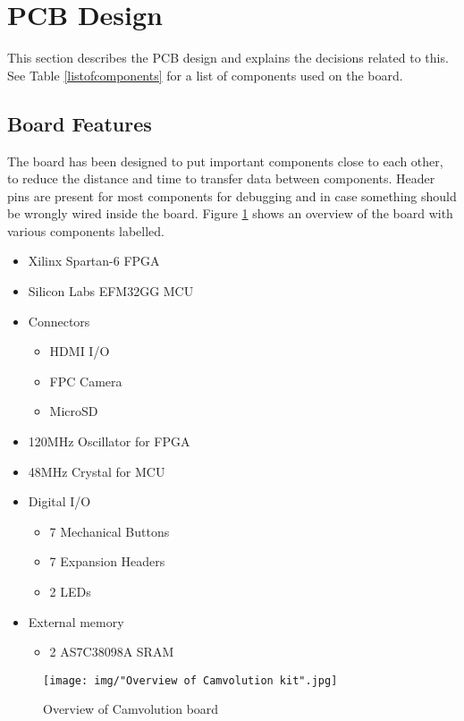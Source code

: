 \section{PCB Design}
This section describes the PCB design and explains the decisions related to this.
See Table \ref{listofcomponents} for a list of components used on the board.

\subsection{Board Features}
The board has been designed to put important components close to each other,
to reduce the distance and time to transfer data between components.
Header pins are present for most components for debugging and in case something should be wrongly wired inside the board.
Figure \ref{fig:BoardLayout} shows an overview of the board with various components labelled.

\begin{itemize}
    \item Xilinx Spartan-6 FPGA
    \item Silicon Labs EFM32GG MCU
    \item Connectors
        \begin{itemize}
            \item HDMI I/O
            \item FPC Camera
            \item MicroSD
        \end{itemize}
    \item 120MHz Oscillator for FPGA
    \item 48MHz Crystal for MCU
    \item Digital I/O
        \begin{itemize}
            \item 7 Mechanical Buttons
            \item 7 Expansion Headers
            \item 2 LEDs
        \end{itemize}
    \item External memory
        \begin{itemize}
            \item 2 AS7C38098A SRAM
        \end{itemize}
\end{itemize}

\begin{figure}[h]
    \texttt{[image: img/"Overview of Camvolution kit".jpg]}
    \caption{Overview of Camvolution board}
    \label{fig:BoardLayout}
\end{figure}

